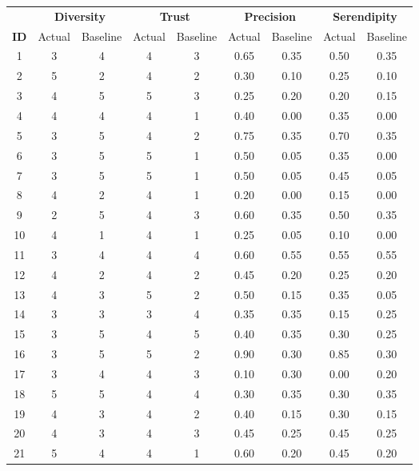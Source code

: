 \begin{table}[ht]
\centering
\footnotesize %
\setlength{\tabcolsep}{4pt} %
\begin{tabular}{|c|cc|cc|cc|cc|}
\hline
 & \multicolumn{2}{c|}{\textbf{Diversity}} & \multicolumn{2}{c|}{\textbf{Trust}} & \multicolumn{2}{c|}{\textbf{Precision}} & \multicolumn{2}{c|}{\textbf{Serendipity}} \\
\textbf{ID} & Actual & Baseline & Actual & Baseline & Actual & Baseline & Actual & Baseline \\
\hline
1 & 3 & 4 & 4 & 3 & 0.65 & 0.35 & 0.50 & 0.35 \\ \hline
2 & 5 & 2 & 4 & 2 & 0.30 & 0.10 & 0.25 & 0.10 \\ \hline
3 & 4 & 5 & 5 & 3 & 0.25 & 0.20 & 0.20 & 0.15 \\ \hline
4 & 4 & 4 & 4 & 1 & 0.40 & 0.00 & 0.35 & 0.00 \\ \hline
5 & 3 & 5 & 4 & 2 & 0.75 & 0.35 & 0.70 & 0.35 \\ \hline
6 & 3 & 5 & 5 & 1 & 0.50 & 0.05 & 0.35 & 0.00 \\ \hline
7 & 3 & 5 & 5 & 1 & 0.50 & 0.05 & 0.45 & 0.05 \\ \hline
8 & 4 & 2 & 4 & 1 & 0.20 & 0.00 & 0.15 & 0.00 \\ \hline
9 & 2 & 5 & 4 & 3 & 0.60 & 0.35 & 0.50 & 0.35 \\ \hline
10 & 4 & 1 & 4 & 1 & 0.25 & 0.05 & 0.10 & 0.00 \\ \hline
11 & 3 & 4 & 4 & 4 & 0.60 & 0.55 & 0.55 & 0.55 \\ \hline
12 & 4 & 2 & 4 & 2 & 0.45 & 0.20 & 0.25 & 0.20 \\ \hline
13 & 4 & 3 & 5 & 2 & 0.50 & 0.15 & 0.35 & 0.05 \\ \hline
14 & 3 & 3 & 3 & 4 & 0.35 & 0.35 & 0.15 & 0.25 \\ \hline
15 & 3 & 5 & 4 & 5 & 0.40 & 0.35 & 0.30 & 0.25 \\ \hline
16 & 3 & 5 & 5 & 2 & 0.90 & 0.30 & 0.85 & 0.30 \\ \hline
17 & 3 & 4 & 4 & 3 & 0.10 & 0.30 & 0.00 & 0.20 \\ \hline
18 & 5 & 5 & 4 & 4 & 0.30 & 0.35 & 0.30 & 0.35 \\ \hline
19 & 4 & 3 & 4 & 2 & 0.40 & 0.15 & 0.30 & 0.15 \\ \hline
20 & 4 & 3 & 4 & 3 & 0.45 & 0.25 & 0.45 & 0.25 \\ \hline
21 & 5 & 4 & 4 & 1 & 0.60 & 0.20 & 0.45 & 0.20 \\ \hline

\end{tabular}
\end{table}
